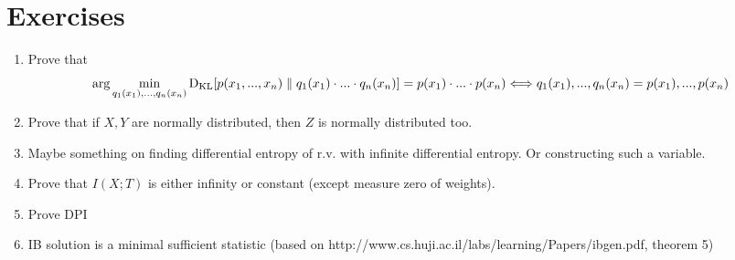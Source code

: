 \documentclass{article}
\begin{document}
\section*{Exercises}
\begin{enumerate}
    \item Prove that
\[
\arg \min_{q_1(x_1) , ... , q_n(x_n)} \text{D}_\text{KL}[p(x_1, ..., x_n) \parallel q_1(x_1) \cdot ... \cdot q_n(x_n)] = p(x_1) \cdot ... \cdot p(x_n) \Longleftrightarrow q_1(x_1) , ... , q_n(x_n) = p(x_1), ..., p(x_n)
\]
    \item Prove that if $X, Y$ are normally distributed, then $Z$ is normally distributed too. %
    \item Maybe something on finding differential entropy of r.v. with infinite differential entropy. Or constructing such a variable.
    \item Prove that $I(X;T)$ is either infinity or constant (except measure zero of weights).
    \item Prove DPI
    \item IB solution is a minimal sufficient statistic (based on http://www.cs.huji.ac.il/labs/learning/Papers/ibgen.pdf, theorem 5)
\end{enumerate}
\end{document}
